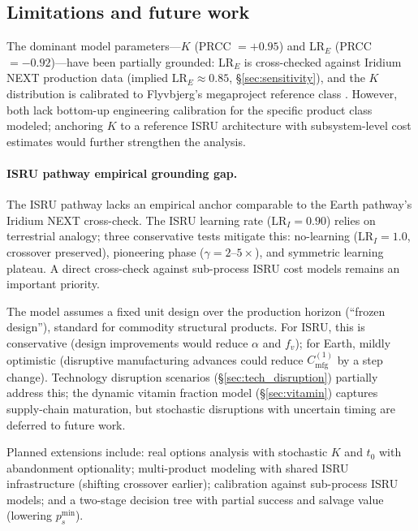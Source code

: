 \subsection{Limitations and future work}

The dominant model parameters---$K$ (PRCC $= +0.95$) and LR$_E$ (PRCC $= -0.92$)---have been partially grounded: LR$_E$ is cross-checked against Iridium NEXT production data (implied $\mathrm{LR}_E \approx 0.85$, \S\ref{sec:sensitivity}), and the $K$ distribution is calibrated to Flyvbjerg's megaproject reference class \cite{flyvbjerg2014}. However, both lack bottom-up engineering calibration for the specific product class modeled; anchoring $K$ to a reference ISRU architecture with subsystem-level cost estimates would further strengthen the analysis.

\paragraph{ISRU pathway empirical grounding gap.} The ISRU pathway lacks an empirical anchor comparable to the Earth pathway's Iridium NEXT cross-check. The ISRU learning rate ($\mathrm{LR}_I = 0.90$) relies on terrestrial analogy; three conservative tests mitigate this: no-learning ($\mathrm{LR}_I = 1.0$, crossover preserved), pioneering phase ($\gamma = 2$--$5\times$), and symmetric learning plateau. A direct cross-check against sub-process ISRU cost models remains an important priority.

The model assumes a fixed unit design over the production horizon (``frozen design''), standard for commodity structural products. For ISRU, this is conservative (design improvements would reduce $\alpha$ and $f_v$); for Earth, mildly optimistic (disruptive manufacturing advances could reduce $C_{\mathrm{mfg}}^{(1)}$ by a step change). Technology disruption scenarios (\S\ref{sec:tech_disruption}) partially address this; the dynamic vitamin fraction model (\S\ref{sec:vitamin}) captures supply-chain maturation, but stochastic disruptions with uncertain timing are deferred to future work.

Planned extensions include: real options analysis with stochastic $K$ and $t_0$ with abandonment optionality; multi-product modeling with shared ISRU infrastructure (shifting crossover earlier); calibration against sub-process ISRU models; and a two-stage decision tree with partial success and salvage value (lowering $p_s^{\min}$).

